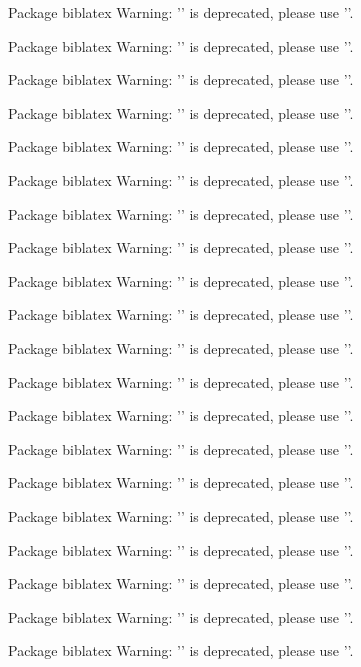 Package biblatex Warning: '\printdatelabel' is deprecated, please use '\printlabeldate'.


Package biblatex Warning: '\printdatelabel' is deprecated, please use '\printlabeldate'.


Package biblatex Warning: '\printdatelabel' is deprecated, please use '\printlabeldate'.


Package biblatex Warning: '\printdatelabel' is deprecated, please use '\printlabeldate'.


Package biblatex Warning: '\printdatelabel' is deprecated, please use '\printlabeldate'.


Package biblatex Warning: '\printdatelabel' is deprecated, please use '\printlabeldate'.


Package biblatex Warning: '\printdatelabel' is deprecated, please use '\printlabeldate'.


Package biblatex Warning: '\printdatelabel' is deprecated, please use '\printlabeldate'.


Package biblatex Warning: '\printdatelabel' is deprecated, please use '\printlabeldate'.


Package biblatex Warning: '\printdatelabel' is deprecated, please use '\printlabeldate'.


Package biblatex Warning: '\printdatelabel' is deprecated, please use '\printlabeldate'.


Package biblatex Warning: '\printdatelabel' is deprecated, please use '\printlabeldate'.


Package biblatex Warning: '\printdatelabel' is deprecated, please use '\printlabeldate'.


Package biblatex Warning: '\printdatelabel' is deprecated, please use '\printlabeldate'.


Package biblatex Warning: '\printdatelabel' is deprecated, please use '\printlabeldate'.


Package biblatex Warning: '\printdatelabel' is deprecated, please use '\printlabeldate'.


Package biblatex Warning: '\printdatelabel' is deprecated, please use '\printlabeldate'.


Package biblatex Warning: '\printdatelabel' is deprecated, please use '\printlabeldate'.


Package biblatex Warning: '\printdatelabel' is deprecated, please use '\printlabeldate'.


Package biblatex Warning: '\printdatelabel' is deprecated, please use '\printlabeldate'.


